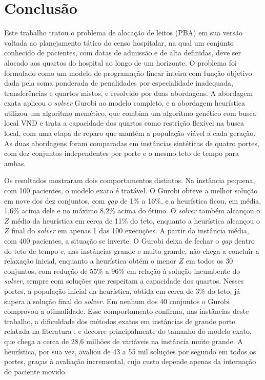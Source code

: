 \chapter{Conclusão}
\label{cap:conclusao}

Este trabalho tratou o problema de alocação de leitos (PBA) em sua versão voltada ao planejamento tático do censo hospitalar, na qual um conjunto conhecido de pacientes, com datas de admissão e de alta definidas, deve ser alocado aos quartos do hospital ao longo de um horizonte. O problema foi formulado como um modelo de programação linear inteira com função objetivo dada pela soma ponderada de penalidades por especialidade inadequada, transferências e quartos mistos, e resolvido por duas abordagens. A abordagem exata aplicou o \textit{solver} Gurobi ao modelo completo, e a abordagem heurística utilizou um algoritmo memético, que combina um algoritmo genético com busca local VND e trata a capacidade dos quartos como restrição flexível na busca local, com uma etapa de reparo que mantém a população viável a cada geração. As duas abordagens foram comparadas em instâncias sintéticas de quatro portes, com dez conjuntos independentes por porte e o mesmo teto de tempo para ambas.

Os resultados mostraram dois comportamentos distintos. Na instância pequena, com 100 pacientes, o modelo exato é tratável. O Gurobi obteve a melhor solução em nove dos dez conjuntos, com \textit{gap} de 1\% a 16\%, e a heurística ficou, em média, 1,6\% acima dele e no máximo 8,2\% acima do ótimo. O \textit{solver} também alcançou o $Z$ médio da heurística em cerca de 11\% do teto, enquanto a heurística alcançou o $Z$ final do \textit{solver} em apenas 1 das 100 execuções. A partir da instância média, com 400 pacientes, a situação se inverte. O Gurobi deixa de fechar o \textit{gap} dentro do teto de tempo e, nas instâncias grande e muito grande, não chega a concluir a relaxação inicial, enquanto a heurística obtém o menor $Z$ em todos os 30 conjuntos, com redução de 55\% a 96\% em relação à solução incumbente do \textit{solver}, sempre com soluções que respeitam a capacidade dos quartos. Nesses portes, a população inicial da heurística, obtida em cerca de 3\% do teto, já supera a solução final do \textit{solver}. Em nenhum dos 40 conjuntos o Gurobi comprovou a otimalidade. Esse comportamento confirma, nas instâncias deste trabalho, a dificuldade dos métodos exatos em instâncias de grande porte relatada na literatura \cite{ceschia2012modeling, demeester2010hybrid}, e decorre principalmente do tamanho do modelo exato, que chega a cerca de 28,6 milhões de variáveis na instância muito grande. A heurística, por sua vez, avaliou de 43 a 55 mil soluções por segundo em todos os portes, graças à avaliação incremental, cujo custo depende apenas da internação do paciente movido.

